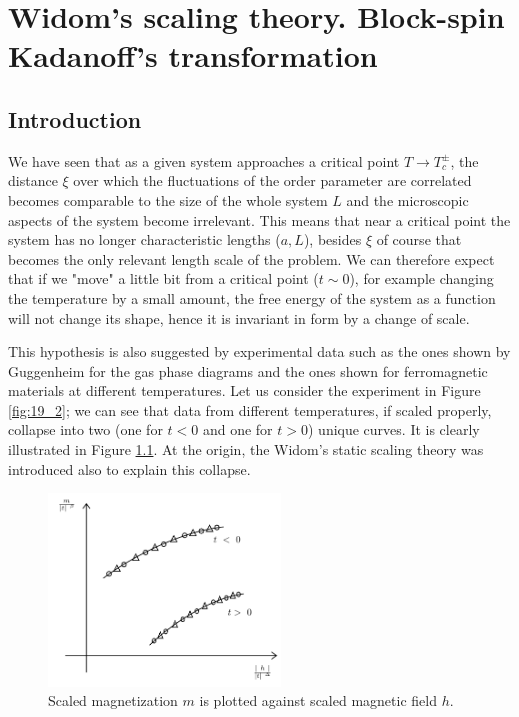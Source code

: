 \documentclass[../../Main/Main.tex]{subfiles}
\begin{document}
\chapter{Widom's scaling theory. Block-spin Kadanoff's transformation}

\section{Introduction}
We have seen  that as a given system approaches a critical point \( T \rightarrow T_c^{\pm} \), the distance \( \xi  \)  over which the fluctuations of the order parameter are correlated becomes comparable to the size of the whole system \( L \) and the microscopic aspects of the system become irrelevant. This means that near a critical point the system has no longer characteristic lengths (\( a,L \)), besides \( \xi  \) of course that becomes the only relevant length scale of the problem. We can therefore expect that if we "move" a little bit from a critical point (\( t \sim 0 \)), for example changing the temperature by a small amount, the free energy of the system as a function will not change its shape, hence it is invariant in form by a change of scale.

 This hypothesis is also suggested by experimental data such as the ones shown by Guggenheim for the gas phase diagrams and the ones shown for ferromagnetic materials at different temperatures. Let us consider the experiment in Figure \ref{fig:19_2}; we can see that data from different temperatures, if scaled properly, collapse into two (one for \( t<0 \) and one for \( t>0 \)) unique curves. It is clearly illustrated in Figure \ref{fig:19_1}. At the origin, the Widom's static scaling theory was introduced also to explain this collapse.

 \begin{figure}[h!]
 \centering
 \includegraphics[width=0.55\textwidth]{./img/1.pdf}
 \caption{\label{fig:19_1} Scaled magnetization \( m \) is plotted against scaled magnetic field \( h \).}
 \end{figure}
\end{document}
